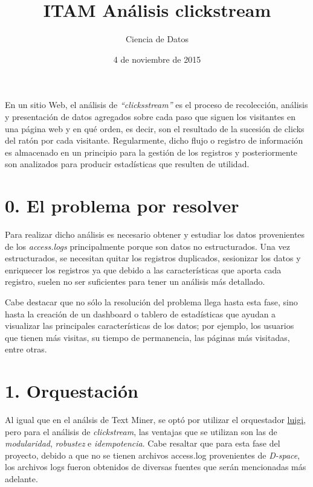 \documentclass[]{article}
\title{ITAM Análisis clickstream}
\author{Ciencia de Datos}
\date{4 de noviembre de 2015}
\begin{document}
\maketitle


En un sitio Web, el análisis de \emph{``clicksstream''} es el proceso de
recolección, análisis y presentación de datos agregados sobre cada paso
que siguen los visitantes en una página web y en qué orden, es decir,
son el resultado de la sucesión de clicks del ratón por cada visitante.
Regularmente, dicho flujo o registro de información es almacenado en un
principio para la gestión de los registros y posteriormente son
analizados para producir estadísticas que resulten de utilidad.

\section{0. El problema por resolver}\label{el-problema-por-resolver}

Para realizar dicho análisis es necesario obtener y estudiar los datos
provenientes de los \emph{access.logs} principalmente porque son datos
no estructurados. Una vez estructurados, se necesitan quitar los
registros duplicados, sesionizar los datos y enriquecer los registros ya
que debido a las características que aporta cada registro, suelen no ser
suficientes para tener un análisis más detallado.

Cabe destacar que no sólo la resolución del problema llega hasta esta
fase, sino hasta la creación de un dashboard o tablero de estadísticas
que ayudan a visualizar las principales características de los datos;
por ejemplo, los usuarios que tienen más visitas, su tiempo de
permanencia, las páginas más visitadas, entre otras.

\section{1. Orquestación}\label{orquestacion}

Al igual que en el análsis de Text Miner, se optó por utilizar el
orquestador \href{http://luigi.readthedocs.org/en/stable/}{luigi}, pero
para el análisis de \emph{clickstream}, las ventajas que se utilizan son
las de \emph{modularidad}, \emph{robustez} e \emph{idempotencia}. Cabe
resaltar que para esta fase del proyecto, debido a que no se tienen
archivos access.log provenientes de \emph{D-space}, los archivos logs
fueron obtenidos de diversas fuentes que serán mencionadas más adelante.
\end{document}
